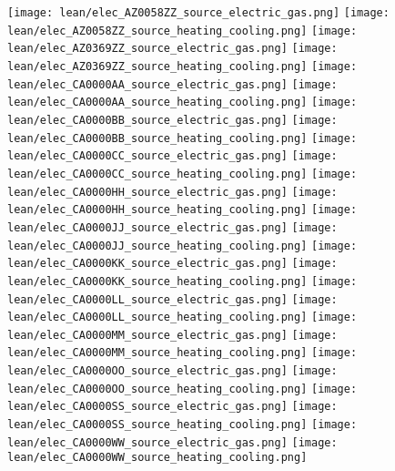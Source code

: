 \texttt{[image: lean/elec\_AZ0058ZZ\_source\_electric\_gas.png]}
\texttt{[image: lean/elec\_AZ0058ZZ\_source\_heating\_cooling.png]}
\texttt{[image: lean/elec\_AZ0369ZZ\_source\_electric\_gas.png]}
\texttt{[image: lean/elec\_AZ0369ZZ\_source\_heating\_cooling.png]}
\texttt{[image: lean/elec\_CA0000AA\_source\_electric\_gas.png]}
\texttt{[image: lean/elec\_CA0000AA\_source\_heating\_cooling.png]}
\texttt{[image: lean/elec\_CA0000BB\_source\_electric\_gas.png]}
\texttt{[image: lean/elec\_CA0000BB\_source\_heating\_cooling.png]}
\texttt{[image: lean/elec\_CA0000CC\_source\_electric\_gas.png]}
\texttt{[image: lean/elec\_CA0000CC\_source\_heating\_cooling.png]}
\texttt{[image: lean/elec\_CA0000HH\_source\_electric\_gas.png]}
\texttt{[image: lean/elec\_CA0000HH\_source\_heating\_cooling.png]}
\texttt{[image: lean/elec\_CA0000JJ\_source\_electric\_gas.png]}
\texttt{[image: lean/elec\_CA0000JJ\_source\_heating\_cooling.png]}
\texttt{[image: lean/elec\_CA0000KK\_source\_electric\_gas.png]}
\texttt{[image: lean/elec\_CA0000KK\_source\_heating\_cooling.png]}
\texttt{[image: lean/elec\_CA0000LL\_source\_electric\_gas.png]}
\texttt{[image: lean/elec\_CA0000LL\_source\_heating\_cooling.png]}
\texttt{[image: lean/elec\_CA0000MM\_source\_electric\_gas.png]}
\texttt{[image: lean/elec\_CA0000MM\_source\_heating\_cooling.png]}
\texttt{[image: lean/elec\_CA0000OO\_source\_electric\_gas.png]}
\texttt{[image: lean/elec\_CA0000OO\_source\_heating\_cooling.png]}
\texttt{[image: lean/elec\_CA0000SS\_source\_electric\_gas.png]}
\texttt{[image: lean/elec\_CA0000SS\_source\_heating\_cooling.png]}
\texttt{[image: lean/elec\_CA0000WW\_source\_electric\_gas.png]}
\texttt{[image: lean/elec\_CA0000WW\_source\_heating\_cooling.png]}
